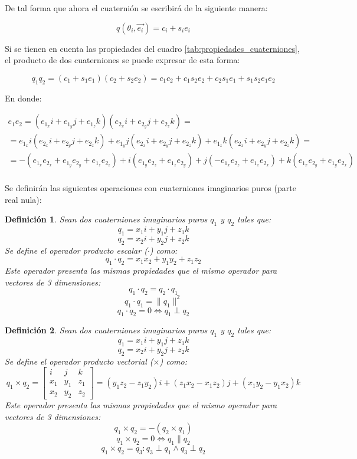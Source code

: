 \documentclass[10pt, a4paper]{report}
\newtheorem{defn}{Definición}[section]
\begin{document}
De tal forma que ahora el cuaternión se escribirá de la siguiente manera:

\begin{equation} \label{eq: q_theta_e}
q(\theta_i, \vec{e_i}) = c_i + s_i e_i
\end{equation}

Si se tienen en cuenta las propiedades del cuadro \ref{tab:propiedades_cuaterniones}, el producto de dos cuaterniones se puede expresar de esta forma:

\begin{equation} \label{eq: E11}
q_1 q_2 = \left( c_1 + s_1 e_1 \right) \left( c_2 + s_2 e_2 \right) = c_1 c_2 + c_1 s_2 e_2 + c_2 s_1 e_1 + s_1 s_2 e_1 e_2
\end{equation}

En donde:

\begin{multline} \label{eq: E10}
e_1 e_2 = (e_{1_x} i + e_{1_y} j + e_{1_z} k)(e_{2_x} i + e_{2_y} j + e_{2_z} k) = \\
= e_{1_x} i (e_{2_x} i + e_{2_y} j + e_{2_z} k) + e_{1_y} j (e_{2_x} i + e_{2_y} j + e_{2_z} k) + e_{1_z} k (e_{2_x} i + e_{2_y} j + e_{2_z} k) = \\
= -(e_{1_x} e_{2_x} + e_{1_y} e_{2_y} + e_{1_z} e_{2_z}) + i (e_{1_y} e_{2_z} + e_{1_z} e_{2_y}) + j (-e_{1_x} e_{2_z} + e_{1_z} e_{2_x}) + k (e_{1_x} e_{2_y} + e_{1_y} e_{2_x}) \\
\end{multline}

Se definirán las siguientes operaciones con cuaterniones imaginarios puros (parte real nula):

\begin{defn}
Sean dos cuaterniones imaginarios puros $q_1$ y $q_2$ tales que:
$$ q_1 = x_1i + y_1j + z_1k $$
$$ q_2 = x_2i + y_2j + z_2k $$
Se define el operador producto escalar ($\cdot$) como:
$$ q_1 \cdot q_2 = x_1x_2 + y_1y_2 + z_1z_2 $$
Este operador presenta las mismas propiedades que el mismo operador para vectores de 3 dimensiones:
$$ q_1 \cdot q_2 = q_2 \cdot q_1 $$
$$ q_1 \cdot q_1 = \|q_1\|^2 $$
$$ q_1 \cdot q_2 = 0 \iff q_1 \perp q_2 $$
\end{defn}

\begin{defn}
Sean dos cuaterniones imaginarios puros $q_1$ y $q_2$ tales que:
$$ q_1 = x_1i + y_1j + z_1k $$
$$ q_2 = x_2i + y_2j + z_2k $$
Se define el operador producto vectorial ($\times$) como:
$$ q_1 \times q_2 = \begin{bmatrix} 
i & j & k \\
x_1 & y_1 & z_1 \\
x_2 & y_2 & z_2
\end{bmatrix} = (y_1z_2 - z_1y_2)i + (z_1x_2 - x_1z_2)j + (x_1y_2 - y_1x_2)k$$
Este operador presenta las mismas propiedades que el mismo operador para vectores de 3 dimensiones:
$$ q_1 \times q_2 = - (q_2 \times q_1) $$
$$ q_1 \times q_2 = 0 \iff q_1 \parallel q_2 $$
$$ q_1 \times q_2 = q_3 : q_3 \perp q_1 \wedge q_3 \perp q_2 $$
\end{defn}
\end{document}
